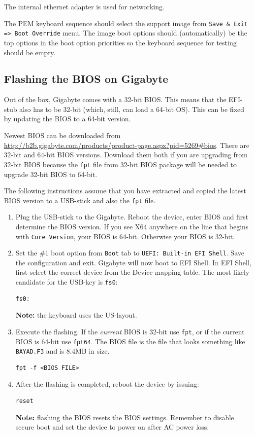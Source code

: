 \documentclass[a4paper,11pt]{article}
\newcommand{\note}{\textbf{Note: }}
\newcommand{\cmd}[1]{\texttt{#1}}
\begin{document}
The internal ethernet adapter is used for networking.

The PEM keyboard sequence should select the support image from \cmd{Save \& Exit => Boot Override} menu. The image boot options should (automatically) be the top options in the boot option priorities so the keyboard sequence for testing should be empty.

\subsection{Flashing the BIOS on Gigabyte}
Out of the box, Gigabyte comes with a 32-bit BIOS. This means that the EFI-stub also has to be 32-bit (which, still, can load a 64-bit OS). This can be fixed by updating the BIOS to a 64-bit version.

Newest BIOS can be downloaded from \url{http://b2b.gigabyte.com/products/product-page.aspx?pid=5269#bios}. There are 32-bit and 64-bit BIOS versions. Download them both if you are upgrading from 32-bit BIOS because the \cmd{fpt} file from 32-bit BIOS package will be needed to upgrade 32-bit BIOS to 64-bit.

The following instructions assume that you have extracted and copied the latest BIOS version to a USB-stick and also the \cmd{fpt} file.

\begin{enumerate}

\item Plug the USB-stick to the Gigabyte. Reboot the device, enter BIOS and first determine the BIOS version. If you see X64 anywhere on the line that begins with \cmd{Core Version}, your BIOS is 64-bit. Otherwise your BIOS is 32-bit.

\item Set the \#1 boot option from \cmd{Boot} tab to \cmd{UEFI: Built-in EFI Shell}. Save the configuration and exit. Gigabyte will now boot to EFI Shell. In EFI Shell, first select the correct device from the Device mapping table. The most likely candidate for the USB-key is \cmd{fs0}:
\begin{lstlisting}
fs0:
\end{lstlisting}
\note the keyboard uses the US-layout.

\item Execute the flashing. If the \textit{current} BIOS is 32-bit use \cmd{fpt}, or if the current BIOS is 64-bit use \cmd{fpt64}. The BIOS file is the file that looks something like \cmd{BAYAD.F3} and is 8.4MB in size.

\begin{lstlisting}
fpt -f <BIOS FILE>
\end{lstlisting}

\item After the flashing is completed, reboot the device by issuing:
\begin{lstlisting}
reset
\end{lstlisting}
\note flashing the BIOS resets the BIOS settings. Remember to disable secure boot and set the device to power on after AC power loss.

\end{enumerate}
\end{document}
